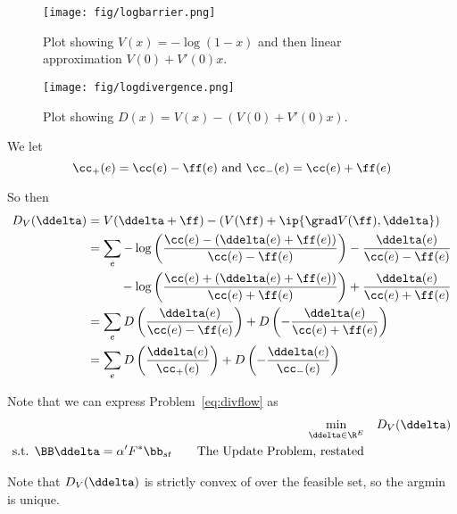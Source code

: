 \begin{figure}[H]
  \centering
    \texttt{[image: fig/logbarrier.png]} %
    \caption{Plot showing ${V(x) = -\log(1-x)}$ and then linear
      approximation ${V(0) + V'(0) x}$.}
\end{figure}


\begin{figure}[H]
  \centering
    \texttt{[image: fig/logdivergence.png]}%
    \caption{Plot showing ${D(x) = V(x) - (V(0) + V'(0) x)}$.}
\end{figure}

  
We let
\[
  \cc_+(e) = \cc(e) - \ff(e) \text{ and } \cc_-(e) = \cc(e) + \ff(e)
\]

So then  
\begin{align*}
  D_V( \ddelta )
  &=
  V(\ddelta+\ff)
  -
  (V(\ff)
  +
  \ip{\grad V(\ff), \ddelta})
  \\
  &=
  \sum_e
  -\log
  \left(\frac{\cc(e)-(\ddelta(e)+\ff(e))}
  {\cc(e)-\ff(e)} 
    \right)
   -
\frac{\ddelta(e)}
  {\cc(e)-\ff(e)} 
  \\
  &\quad\quad\,\,\,\,
  -\log
\left(
  \frac{\cc(e)+(\ddelta(e)+\ff(e))}
  {\cc(e)+\ff(e)} 
  \right)
   +
\frac{\ddelta(e)}
    {\cc(e)+\ff(e)}
  \\
  &=
    \sum_e
    D\left(\frac{\ddelta(e)}
    {\cc(e)-\ff(e)}
    \right)
    +
     D\left(-\frac{\ddelta(e)}
    {\cc(e)+\ff(e)}
    \right)
   \\
  &=
    \sum_e
    D\left(\frac{\ddelta(e)}{\cc_+(e)}\right)
    +
    D\left(-\frac{\ddelta(e)}{\cc_-(e)}\right)
\end{align*}

Note that we can express Problem~\eqref{eq:divflow} as
\begin{align}
   \label{eq:divflow2}
  \min_{\ddelta \in \R^E} & \quad 
      D_V( \ddelta )
  \\
  \textrm{s.t. }  \BB\ddelta = \alpha' F^* \bb_{st}
\tag*{The Update Problem, restated}
\end{align}

Note that  $D_V( \ddelta )$ is strictly convex of over the
feasible set, so the argmin is unique.

